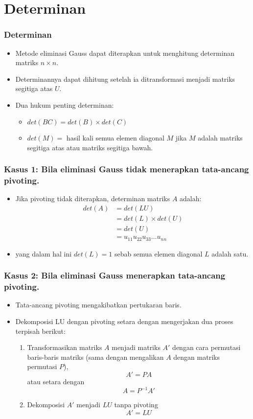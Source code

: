 \documentclass[pdflatex,compress,mathserif]{beamer}
\begin{document}
\section{Determinan}

\begin{frame}
	\frametitle{Determinan}
	\begin{itemize}
		\item Metode eliminasi Gauss dapat diterapkan untuk menghitung
		determinan matriks $ n \times n $.
		\item Determinannya dapat dihitung setelah ia ditransformasi menjadi matriks segitiga atas $ U $.
		\item Dua hukum penting determinan:
		\begin{itemize}
			\item $ det(BC) = det(B) \times det(C) $
			\item $ det(M) = $ hasil kali semua elemen diagonal $ M $ jika $ M $ adalah matriks segitiga atas atau matriks segitiga
			bawah.
		\end{itemize}
	\end{itemize}
\end{frame}

\begin{frame}
	\frametitle{Kasus 1: Bila eliminasi Gauss tidak menerapkan tata-ancang pivoting.}
	\begin{itemize}
		\item Jika pivoting tidak diterapkan, determinan matriks $ A $
		adalah:
		\begin{align*}
			det(A) &= det(LU) \\
			&= det(L) \times det(U) \\
			&= det(U) \\
			&= u_{11}u_{22}u_{33} \dots u_{nn}
		\end{align*}
		\item yang dalam hal ini $ det(L) = 1 $ sebab semua elemen diagonal $ L $ adalah satu.
	\end{itemize}
\end{frame}

\begin{frame}
	\frametitle{Kasus 2: Bila eliminasi Gauss menerapkan tata-ancang pivoting.}
	\begin{itemize}
		\item Tata-ancang pivoting mengakibatkan pertukaran baris.
		\item Dekomposisi LU dengan pivoting setara dengan mengerjakan dua proses terpisah berikut:
		\begin{enumerate}
			\item Transformasikan matriks $ A $ menjadi matriks $ A' $ dengan cara permutasi baris-baris matriks (sama dengan mengalikan $ A $ dengan matriks permutasi $ P $),
			\[ A' = PA \] atau setara dengan \[ A = P^{-1}A' \]
			\item Dekomposisi $ A' $ menjadi $ LU $ tanpa pivoting
			\[A' = LU\]
		\end{enumerate}
	\end{itemize}
\end{frame}
\end{document}
